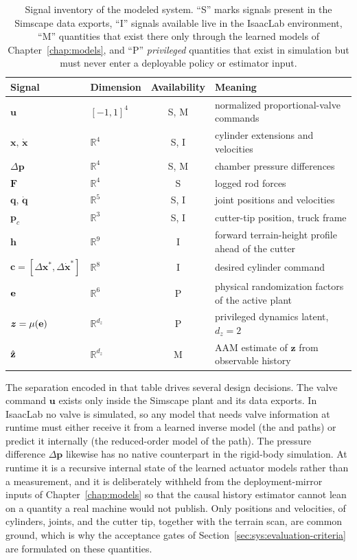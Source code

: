 \begin{table}[tb]
  \centering
  \caption{Signal inventory of the modeled system. ``S'' marks signals
  present in the Simscape data exports, ``I'' signals available live in
  the IsaacLab environment, ``M'' quantities that exist there only
  through the learned models of Chapter~\ref{chap:models}, and ``P''
  \emph{privileged} quantities that exist in simulation but must never
  enter a deployable policy or estimator input.}
  \label{tab:sys:signals}
  \small
  \begin{tabular}{llcl}
    \toprule
    Signal & Dimension & Availability & Meaning \\
    \midrule
    $\bm{u}$ & $[-1,1]^4$ & S, M & normalized proportional-valve commands \\
    $\bm{x},\, \dot{\bm{x}}$ & $\mathbb{R}^4$ & S, I & cylinder extensions and velocities \\
    $\Delta\bm{p}$ & $\mathbb{R}^4$ & S, M & chamber pressure differences \\
    $\bm{F}$ & $\mathbb{R}^4$ & S & logged rod forces \\
    $\bm{q},\, \dot{\bm{q}}$ & $\mathbb{R}^5$ & S, I & joint positions and velocities \\
    $\bm{p}_c$ & $\mathbb{R}^3$ & S, I & cutter-tip position, truck frame \\
    $\bm{h}$ & $\mathbb{R}^{9}$ & I & forward terrain-height profile ahead of the cutter \\
    $\bm{c} = [\Delta\bm{x}^*, \Delta\dot{\bm{x}}^*]$ & $\mathbb{R}^8$ & I & desired cylinder command \\
    $\mathbf{e}$ & $\mathbb{R}^6$ & P & physical randomization factors of the active plant \\
    $\bm{z} = \mu(\mathbf{e})$ & $\mathbb{R}^{d_z}$ & P & privileged dynamics latent, $d_z = 2$ \\
    $\hat{\mathbf{z}}$ & $\mathbb{R}^{d_z}$ & M & AAM estimate of $\bm{z}$ from observable history \\
    \bottomrule
  \end{tabular}
\end{table}

The separation encoded in that table drives several design decisions.
The valve command $\bm{u}$ exists only inside the Simscape plant and
its data exports. In IsaacLab no valve is simulated, so any model that
needs valve information at runtime must either receive it from a
learned inverse model (the \ppoIDFD{} and \ppoIDAAMFD{} paths) or
predict it internally (the reduced-order model of the \ppoROM{} path).
The pressure difference $\Delta\bm{p}$ likewise has no native
counterpart in the rigid-body simulation. At runtime it is a recursive
internal state of the learned actuator models rather than a
measurement, and it is deliberately withheld from the deployment-mirror
inputs of Chapter~\ref{chap:models} so that the causal history estimator
cannot lean on a quantity a real machine would not publish. Only
positions and velocities, of cylinders, joints, and the cutter tip,
together with the terrain scan, are common ground, which is why the
acceptance gates of Section~\ref{sec:sys:evaluation-criteria} are formulated on these quantities.

